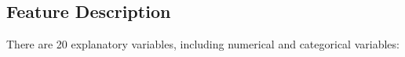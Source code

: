 \documentclass[11pt,a4paper]{article}
\begin{document}
    
    
    \subsection{Feature Description}
    There are 20 explanatory variables, including numerical and categorical variables:
    
\end{document}
